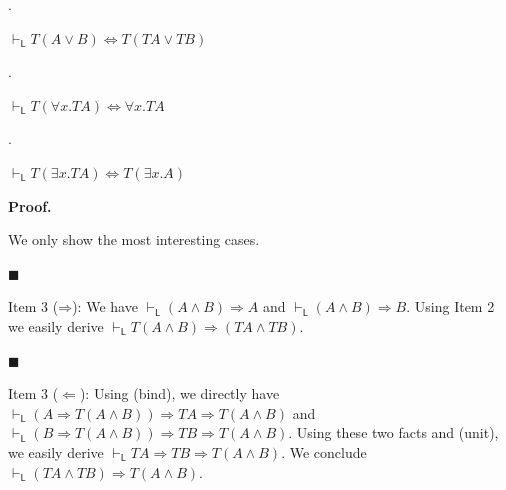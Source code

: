  
 
\par{}. 
 
$\vdash_{\mathsf{L}}T(A\mathbin{\vee}B)\Leftrightarrow T(TA\mathbin{\vee}TB)$\par
 
 
 
\par{}. 
 
$\vdash_{\mathsf{L}}T({\forall}x.TA)\Leftrightarrow{\forall}x.TA$\par
 
 
 
\par{}. 
 
$\vdash_{\mathsf{L}}T({\exists}x.TA)\Leftrightarrow T({\exists}x.A)$\par
 
 
  
 
 
 
\par\medskip\noindent\textbf{Proof.}\par
 
 
We only show the most interesting cases.\par
  
\par\noindent  $\blacksquare$ 
 
Item 3 ($\mathbin{\Rightarrow}$): We have $\vdash_{\mathsf{L}}(A\mathbin{\wedge}B)\mathbin{\Rightarrow}A$ and $\vdash_{\mathsf{L}}(A\mathbin{\wedge}B)\mathbin{\Rightarrow}B$. Using Item 2 we easily derive $\vdash_{\mathsf{L}}T(A\mathbin{\wedge}B)\mathbin{\Rightarrow}(TA\mathbin{\wedge}TB)$.\par
 
 
 
\par\noindent  $\blacksquare$ 
 
Item 3 ($\Leftarrow$): Using (bind), we directly have $\vdash_{\mathsf{L}}(A\mathbin{\Rightarrow}T(A\mathbin{\wedge}B))\mathbin{\Rightarrow}TA\mathbin{\Rightarrow}T(A\mathbin{\wedge}B)$ and $\vdash_{\mathsf{L}}(B\mathbin{\Rightarrow}T(A\mathbin{\wedge}B))\mathbin{\Rightarrow}TB\mathbin{\Rightarrow}T(A\mathbin{\wedge}B)$. Using these two facts and (unit), we easily derive $\vdash_{\mathsf{L}}TA\mathbin{\Rightarrow}TB\mathbin{\Rightarrow}T(A\mathbin{\wedge}B)$. We conclude $\vdash_{\mathsf{L}}(TA\mathbin{\wedge}TB)\mathbin{\Rightarrow}T(A\mathbin{\wedge}B)$.\par
 
